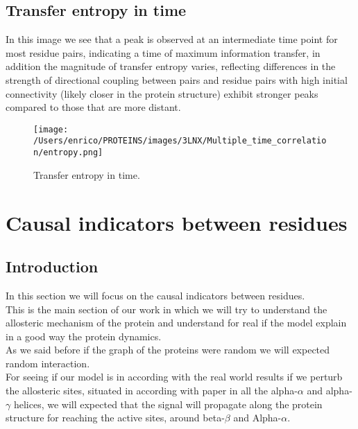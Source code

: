 \documentclass[English, Lau, oneside]{sapthesis}
\begin{document}
\subsection{Transfer entropy in time}
\noindent In this image we see that a peak is observed at an intermediate time point for most residue pairs, indicating a time of maximum information transfer, in addition the magnitude of transfer entropy varies, reflecting differences in the strength of directional coupling between pairs and residue pairs with high initial connectivity (likely closer in the protein structure) exhibit stronger peaks compared to those that are more distant.\\
\begin{figure}[h!]
    \centering
    \texttt{[image: /Users/enrico/PROTEINS/images/3LNX/Multiple\_time\_correlation/entropy.png]}    
    \caption{Transfer entropy  in time.}
\end{figure}


\newpage

\section{Causal indicators between residues}
\subsection{Introduction}
\noindent In this section we will focus on the causal indicators between residues.\\ 
This is the main section of our work in which we will try to understand the allosteric mechanism of the protein and understand for real if the model explain in a good way the protein dynamics.\\
As we said before if the graph of the proteins were random we will expected random interaction.\\ 
For seeing if our model is in according with the real world results if we perturb the allosteric sites, situated in according with paper \cite{ref15} in all the alpha-$\alpha$ and alpha-$\gamma$ helices, we will expected that the signal will propagate along the protein structure for reaching the active sites, around beta-$\beta$ and Alpha-$\alpha$.\\
\end{document}
